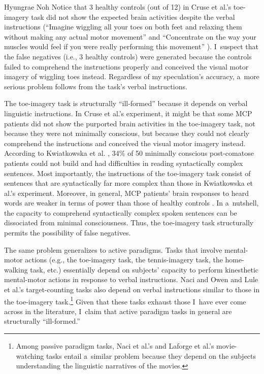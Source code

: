 \begin{artengenv}{Hyungrae Noh}
Notice that 3 healthy controls (out of 12) in Cruse et al.'s
\parencite*[][]{cruse_bedside_2011} %
 toe-imagery task did not show the expected brain activities despite the verbal instructions (``Imagine wiggling all your toes on both feet and relaxing them without making any actual motor movement'' and ``Concentrate on the way your muscles would feel if you were really performing this movement'' 
\parencite[][p.2098]{cruse_bedside_2011}%
). I~suspect that the false negatives (i.e., 3 healthy controls) were generated because the controls failed to comprehend the instructions properly and conceived the visual motor imagery of wiggling toes instead. Regardless of my speculation's accuracy, a~more serious problem follows from the task's verbal instructions.

The toe-imagery task is structurally ``ill-formed'' because it depends on verbal linguistic instructions. In Cruse et al.'s experiment, it might be that some MCP patients did not show the purported brain activities in the toe-imagery task, not because they were not minimally conscious, but because they could not clearly comprehend the instructions and conceived the visual motor imagery instead. According to Kwiatkowska et al.
\parencite*[][]{kwiatkowska_post-comatose_2019}, %
 34\% of 50 minimally conscious post-comatose patients could not build and had difficulties in reading syntactically complex sentences. Most importantly, the instructions of the toe-imagery task consist of sentences that are syntactically far more complex than those in Kwiatkowska et al.'s experiment. Moreover, in general, MCP patients' brain responses to heard words are weaker in terms of power than those of healthy controls 
\parencite[][]{nigri_neural_2017}. %
 In a~nutshell, the capacity to comprehend syntactically complex spoken sentences can be dissociated from minimal consciousness. Thus, the toe-imagery task structurally permits the possibility of false negatives.

The same problem generalizes to active paradigms. Tasks that involve mental-motor actions (e.g., the toe-imagery task, the tennis-imagery task, the home-walking task, etc.) essentially depend on subjects' capacity to perform kinesthetic mental-motor actions in response to verbal instructions. Naci and Owen
\parencite*[][]{naci_making_2013} %
 and Lule et al.'s 
\parencite*[][]{lule_probing_2013} %
 target-counting tasks also depend on verbal instructions similar to those in the toe-imagery task.\footnote{Among passive paradigm tasks, Naci et al.'s 
\parencite*[][]{naci_common_2014} %
 and Laforge et al.'s 
\parencite*[][]{laforge_individualized_2020} %
 movie-watching tasks entail a~similar problem because they depend on the subjects understanding the linguistic narratives of the movies.} Given that these tasks exhaust those I~have ever come across in the literature, I~claim that active paradigm tasks in general are structurally ``ill-formed.''


\end{artengenv}
